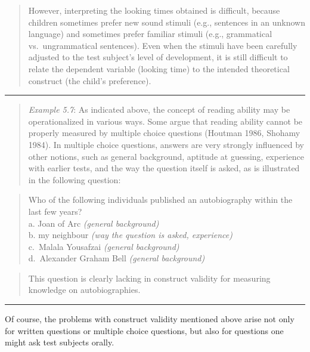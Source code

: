 \documentclass[
]{book}
\begin{document}
\begin{quote}
However, interpreting the looking times obtained is difficult, because children sometimes prefer new sound stimuli (e.g., sentences in an unknown language) and sometimes prefer familiar stimuli (e.g., grammatical vs.~ungrammatical sentences). Even when the stimuli have been carefully adjusted to the test subject's level of development, it is still difficult to relate the dependent variable (looking time) to the intended theoretical construct (the child's preference).
\end{quote}

\begin{center}\rule{0.5\linewidth}{0.5pt}\end{center}

\begin{quote}
\emph{Example 5.7}: As indicated above, the concept of reading ability may be operationalized in various ways. Some argue that reading ability cannot be properly measured by multiple choice questions (Houtman 1986, Shohamy 1984). In multiple choice questions, answers are very strongly influenced by other notions, such as general background, aptitude at guessing, experience with earlier tests, and the way the question itself is asked, as is illustrated in the following question:
\end{quote}

\begin{quote}
Who of the following individuals published an autobiography within the last few years?\\
a. Joan of Arc \emph{(general background)}\\
b. my neighbour \emph{(way the question is asked, experience)}\\
c.~Malala Yousafzai \emph{(general background)}\\
d.~Alexander Graham Bell \emph{(general background)}\\
\end{quote}

\begin{quote}
This question is clearly lacking in construct validity for measuring knowledge on autobiographies.
\end{quote}

\begin{center}\rule{0.5\linewidth}{0.5pt}\end{center}

Of course, the problems with construct validity mentioned above arise not only for written questions or multiple choice questions, but also for questions one might ask test subjects orally.
\end{document}
